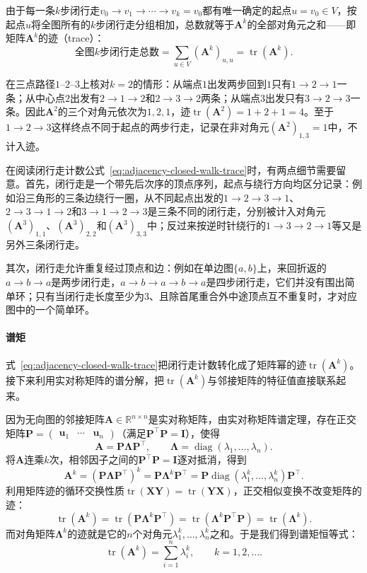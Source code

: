 由于每一条$k$步闭行走$v_0\to v_1\to\cdots\to v_k=v_0$都有唯一确定的起点$u=v_0\in V$，按起点$u$将全图所有的$k$步闭行走分组相加，总数就等于$\bm A^k$的全部对角元之和——即矩阵$\bm A^k$的迹（trace）：
\begin{equation}
\text{全图$k$步闭行走总数}
=\sum_{u\in V}(\bm A^k)_{u,u}
=\operatorname{tr}(\bm A^k).
\label{eq:adjacency-closed-walk-trace}
\end{equation}

在三点路径$1\text{--}2\text{--}3$上核对$k=2$的情形：从端点$1$出发两步回到$1$只有$1\to2\to1$一条；从中心点$2$出发有$2\to1\to2$和$2\to3\to2$两条；从端点$3$出发只有$3\to2\to3$一条。因此$\bm A^2$的三个对角元依次为$1,2,1$，迹$\operatorname{tr}(\bm A^2)=1+2+1=4$。至于$1\to2\to3$这样终点不同于起点的两步行走，记录在非对角元$(\bm A^2)_{1,3}=1$中，不计入迹。

在阅读闭行走计数公式~\eqref{eq:adjacency-closed-walk-trace}时，有两点细节需要留意。首先，闭行走是一个带先后次序的顶点序列，起点与绕行方向均区分记录：例如沿三角形的三条边绕行一圈，从不同起点出发的$1\to2\to3\to1$、$2\to3\to1\to2$和$3\to1\to2\to3$是三条不同的闭行走，分别被计入对角元$(\bm A^3)_{1,1}$、$(\bm A^3)_{2,2}$和$(\bm A^3)_{3,3}$中；反过来按逆时针绕行的$1\to3\to2\to1$等又是另外三条闭行走。

其次，闭行走允许重复经过顶点和边：例如在单边图$\{a,b\}$上，来回折返的$a\to b\to a$是两步闭行走，$a\to b\to a\to b\to a$是四步闭行走，它们并没有围出简单环；只有当闭行走长度至少为$3$、且除首尾重合外中途顶点互不重复时，才对应图中的一个简单环。

\paragraph{谱矩}

式~\eqref{eq:adjacency-closed-walk-trace}把闭行走计数转化成了矩阵幂的迹$\operatorname{tr}(\bm A^k)$。接下来利用实对称矩阵的谱分解，把$\operatorname{tr}(\bm A^k)$与邻接矩阵的特征值直接联系起来。

因为无向图的邻接矩阵$\bm A\in\mathbb R^{n\times n}$是实对称矩阵，由实对称矩阵谱定理，存在正交矩阵$\bm P=\begin{pmatrix}\bm u_1&\cdots&\bm u_n\end{pmatrix}$（满足$\bm P^\top\bm P=\bm I$），使得
\[
\bm A=\bm P\bm\Lambda\bm P^\top,
\qquad
\bm\Lambda=\operatorname{diag}(\lambda_1,\ldots,\lambda_n).
\]
将$\bm A$连乘$k$次，相邻因子之间的$\bm P^\top\bm P=\bm I$逐对抵消，得到
\[
\bm A^k=(\bm P\bm\Lambda\bm P^\top)^k=\bm P\bm\Lambda^k\bm P^\top
=\bm P\operatorname{diag}(\lambda_1^k,\ldots,\lambda_n^k)\bm P^\top.
\]
利用矩阵迹的循环交换性质$\operatorname{tr}(\bm X\bm Y)=\operatorname{tr}(\bm Y\bm X)$，正交相似变换不改变矩阵的迹：
\[
\operatorname{tr}(\bm A^k)
=\operatorname{tr}(\bm P\bm\Lambda^k\bm P^\top)
=\operatorname{tr}(\bm\Lambda^k\bm P^\top\bm P)
=\operatorname{tr}(\bm\Lambda^k).
\]
而对角矩阵$\bm\Lambda^k$的迹就是它的$n$个对角元$\lambda_1^k,\ldots,\lambda_n^k$之和。于是我们得到谱矩恒等式：
\begin{equation}
\operatorname{tr}(\bm A^k)=\sum_{i=1}^{n}\lambda_i^k,
\qquad k=1,2,\ldots .
\label{eq:adjacency-spectral-moments}
\end{equation}

